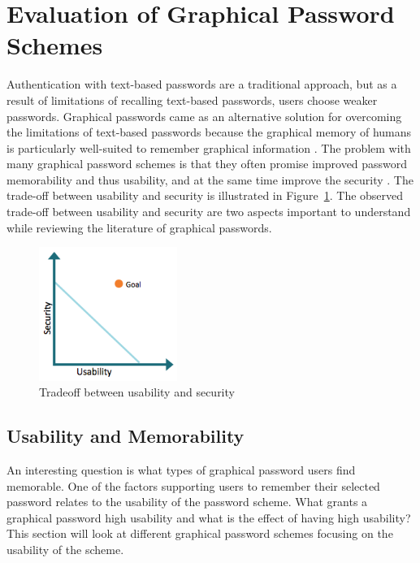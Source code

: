 \section{Evaluation of Graphical Password Schemes} \label{sec:evaluation}
	
  Authentication with text-based passwords are a traditional approach, but as a result of limitations of recalling text-based passwords, users choose weaker passwords. Graphical passwords came as an alternative solution for overcoming the limitations of text-based passwords because the graphical memory of humans is particularly well-suited to remember graphical information \cite{DeAngeli}. The problem with many graphical password schemes is that they often promise improved password memorability and thus usability, and at the same time improve the security \cite{Biddle}. The trade-off between usability and security is illustrated in Figure~\ref{fig:usabilitysecurity}. The observed trade-off between usability and security are two aspects important to understand while reviewing the literature of graphical passwords.

  	\begin{figure}[H]
  		\centering
  		\includegraphics[width=0.40\textwidth]{pics/review/tradeoff.png}
  		\caption{Tradeoff between usability and security}
  		\label{fig:usabilitysecurity}
  	\end{figure}

  \subsection{Usability and Memorability} \label{sec:usability}

    An interesting question is what types of graphical password users find memorable. One of the factors supporting users to remember their selected password relates to the usability of the password scheme. What grants a graphical password high usability and what is the effect of having high usability? This section will look at different graphical password schemes focusing on the usability of the scheme. 

